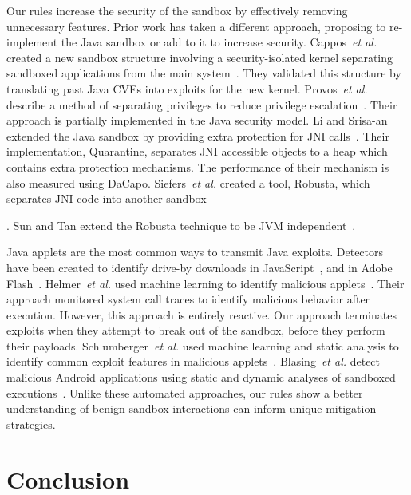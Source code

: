 \documentclass{sig-alternate}
\begin{document}
Our rules increase the security of the sandbox
by effectively removing unnecessary features. Prior work has taken a different
approach, proposing to re-implement the Java sandbox or
add to it to increase security. Cappos~\emph{et al.} created
a new sandbox structure involving a security-isolated kernel
separating sandboxed applications from the main system~\cite{cappos_retaining_2010}.
They validated this structure by translating past Java CVEs into exploits
for the new kernel. 
Provos~\emph{et al.} describe a method of separating
privileges to reduce privilege escalation~\cite{Provos-PrivilegeEscalation}.
Their approach is partially implemented in the Java security model.
Li and Srisa-an extended the Java sandbox by providing extra protection
for JNI calls~\cite{li_quarantine:_2011}. Their implementation, Quarantine,
separates JNI accessible objects to a heap which contains extra protection
mechanisms. The performance of their mechanism is also measured using
DaCapo. Siefers~\emph{et al.} created a tool, Robusta, which separates JNI
code into another sandbox~\cite{siefers_robusta:_2010}%

. Sun and Tan extend the Robusta technique to be JVM independent~\cite{sun_jvm-portable_2012}. 

Java applets are the most common ways to transmit Java exploits. Detectors
have been created to identify drive-by downloads in JavaScript~\cite{cova_detection_2010},
and in Adobe Flash~\cite{ford_analyzing_2009}. Helmer~\emph{et al.} used
machine learning to identify malicious applets~\cite{helmer_anomalous_2001}.
Their approach monitored system call traces to identify malicious
behavior after execution. However, this approach is entirely reactive.
Our approach terminates exploits when they attempt to break out of
the sandbox, before they perform their payloads. Schlumberger~\emph{et al.}
used machine learning and static analysis to identify common 
exploit features in malicious applets~\cite{schlumberger_jarhead_2012}.
Blasing~\emph{et al.} detect malicious Android applications using static and dynamic analyses of sandboxed
executions~\cite{Blasing-AndriodSandbox}.
Unlike these automated approaches, our rules show a better understanding of
benign sandbox interactions can inform unique
mitigation strategies.

\section{Conclusion}\label{sec:Conclusion}
\end{document}
